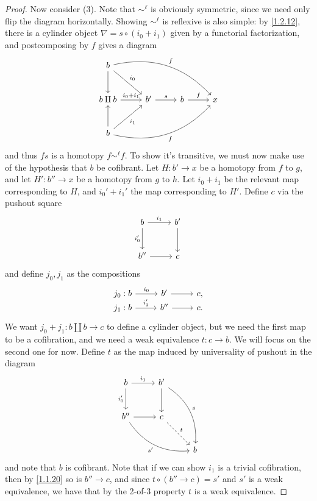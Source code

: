 \begin{proof}
	Now consider (3). Note that $\sim ^\ell $ is obviously symmetric, since we need only flip the diagram horizontally. Showing $\sim ^\ell $ is reflexive is also simple: by \cref{1.2.12}, there is a cylinder object $\nabla = s\circ (i_0+i_1)$ given by a functorial factorization, and postcomposing by $f$ gives a diagram
	\[\begin{tikzcd}[row sep = 2.5em, column sep = 2.5em]
	b \ar[d] \ar[" f ", bend left, drrr]\ar[" i_0 ", dr]  &  &  &\\
	b\amalg b \ar[" i_0+i_1 ", r] & b' \ar[" s ", r]  & b \ar[" f ", r] & x   \\
	b \ar[u] \ar[" i_1 "', ur] \ar[" f "', bend right, urrr] &  &  & 
	\end{tikzcd}\]
	and thus $fs$ is a homotopy $f\sim ^\ell f$. To show it's transitive, we must now make use of the hypothesis that $b$ be cofibrant. Let $H : b' \to x$ be a homotopy from $f$ to $g$, and let $H': b'' \to x$ be a homotopy from $g$ to $h$. Let $i_0+i_1$ be the relevant map corresponding to $H$, and $i_0'+i_1'$ the map corresponding to $H'$. Define $c$ via the pushout square
	\[\begin{tikzcd}[row sep = 2.5em, column sep = 2.5em]
	b \ar[" i_1 ", r] \ar[" i_0' "', d]  & b' \ar[d]  \\
	b''\ar[r]  & c
	\end{tikzcd}\]
	and define $j_0,j_1$ as the compositions
	\[\begin{tikzcd}[row sep = 0em, column sep = 2.5em]
	j_0:b \ar[" i_0 ", r]  & b' \ar[r]  & c,\\
	j_1: b \ar[" i_1' ", r] & b'' \ar[r] & c.
	\end{tikzcd}\]
	We want $j_0+j_1 : b\amalg b \to c$ to define a cylinder object, but we need the first map to be a cofibration, and we need a weak equivalence $t : c\to b$. We will focus on the second one for now. Define $t$ as the map induced by universality of pushout in the diagram
	\[\begin{tikzcd}[row sep = 2.5em, column sep = 2.5em]
	b \ar[" i_1 ", r] \ar[" i_0' "', d]  & b' \ar[d] \ar[" s ", bend left, ddr] \\
	b''\ar[r] \ar[" s' "', bend right, drr] & c\ar[" t ", dashed, dr]\\
						& & b
	\end{tikzcd}\]
	and note that $b$ is cofibrant. Note that if we can show $i_1$ is a trivial cofibration, then by \cref{1.1.20} so is $b''\to c$, and since $t\circ (b''\to c)=s'$ and $s'$ is a weak equivalence, we have that by the 2-of-3 property $t$ is a weak equivalence.


\end{proof}
